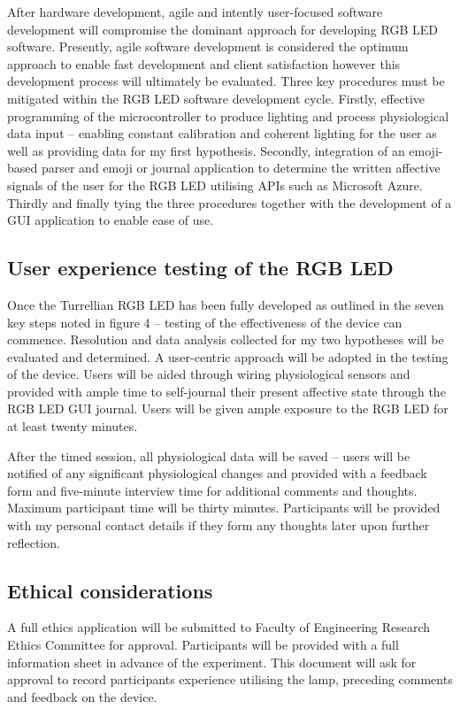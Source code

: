\documentclass{sigchi}
\begin{document}
After hardware development, agile and intently user-focused software development will compromise the dominant approach for developing RGB LED software. Presently, agile software development is considered the optimum approach to enable fast development and client satisfaction however this development process will ultimately be evaluated. Three key procedures must be mitigated within the RGB LED software development cycle. Firstly, effective programming of the microcontroller to produce lighting and process physiological data input – enabling constant calibration and coherent lighting for the user as well as providing data for my first hypothesis. Secondly, integration of an emoji-based parser and emoji or journal application to determine the written affective signals of the user for the RGB LED utilising APIs such as Microsoft Azure. Thirdly and finally tying the three procedures together with the development of a GUI application to enable ease of use. 

\subsection{User experience testing of the RGB LED}

Once the Turrellian RGB LED has been fully developed as outlined in the seven key steps noted in figure 4 – testing of the effectiveness of the device can commence. Resolution and data analysis collected for my two hypotheses will be evaluated and determined. A user-centric approach will be adopted in the testing of the device. Users will be aided through wiring physiological sensors and provided with ample time to self-journal their present affective state through the RGB LED GUI journal. Users will be given ample exposure to the RGB LED for at least twenty minutes.

After the timed session, all physiological data will be saved – users will be notified of any significant physiological changes and provided with a feedback form and five-minute interview time for additional comments and thoughts. Maximum participant time will be thirty minutes. Participants will be provided with my personal contact details if they form any thoughts later upon further reflection.

\subsection{Ethical considerations}

A full ethics application will be submitted to Faculty of Engineering Research Ethics Committee for approval. Participants will be provided with a full information sheet in advance of the experiment. This document will ask for approval to record participants experience utilising the lamp, preceding comments and feedback on the device. 
\end{document}
